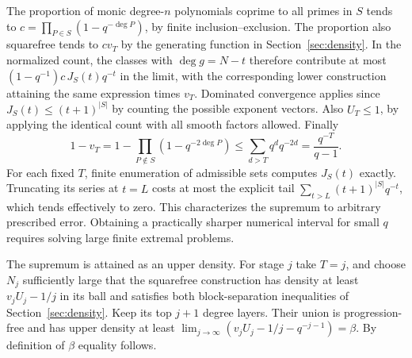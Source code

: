 The proportion of monic degree-$n$ polynomials coprime to all primes in
$S$ tends to $c=\prod_{P\in S}(1-q^{-\deg P})$, by finite
inclusion--exclusion. The proportion also squarefree tends to $cv_T$ by
the generating function in Section~\ref{sec:density}. In the normalized
count, the classes with $\deg g=N-t$ therefore contribute at most
$(1-q^{-1})c\,J_S(t)q^{-t}$ in the limit, with the corresponding
lower construction attaining the same expression times $v_T$. Dominated
convergence applies since $J_S(t)\le(t+1)^{|S|}$ by counting the possible
exponent vectors. Also $U_T\le1$, by applying the identical count with
all smooth factors allowed. Finally
\[
 1-v_T=1-\prod_{P\notin S}(1-q^{-2\deg P})
 \le \sum_{d>T}q^d q^{-2d}=\frac{q^{-T}}{q-1}.
\]
For each fixed $T$, finite enumeration of admissible sets computes
$J_S(t)$ exactly. Truncating its series at $t=L$ costs at most the
explicit tail $\sum_{t>L}(t+1)^{|S|}q^{-t}$, which tends effectively to zero.
This characterizes the supremum to arbitrary prescribed error. Obtaining
a practically sharper numerical interval for small $q$ requires solving
large finite extremal problems.

The supremum is attained as an upper density. For stage $j$ take $T=j$,
and choose $N_j$ sufficiently large that the squarefree construction has
density at least $v_jU_j-1/j$ in its ball and satisfies both block-separation
inequalities of Section~\ref{sec:density}. Keep its top $j+1$ degree layers.
Their union is progression-free and has upper density at least
$\lim_{j\to\infty}(v_jU_j-1/j-q^{-j-1})=\beta$. By definition of
$\beta$ equality follows.
